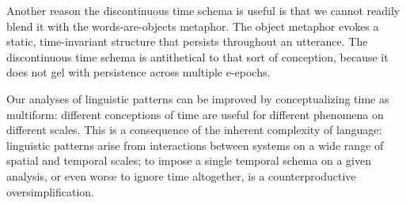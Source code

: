   Another reason the discontinuous time schema is useful is that we cannot readily blend it with the words-are-objects metaphor. The object metaphor evokes a static, time-invariant structure that persists throughout an utterance. The discontinuous time schema is antithetical to that sort of conception, because it does not gel with persistence across multiple e-epochs. 

  Our analyses of linguistic patterns can be improved by conceptualizing time as multiform: different conceptions of time are useful for different phenomena on different scales. This is a consequence of the inherent complexity of language: linguistic patterns arise from interactions between systems on a wide range of spatial and temporal scales; to impose a single temporal schema on a given analysis, or even worse to ignore time altogether, is a counterproductive oversimplification. 

